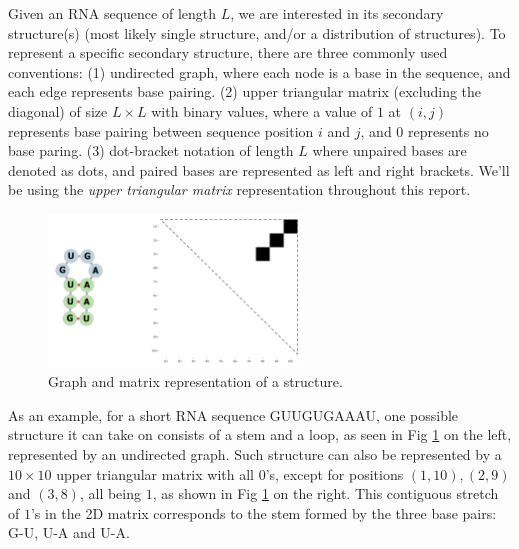 \documentclass[12pt]{article}
\begin{document}

Given an RNA sequence of length $L$, we are interested in its secondary structure(s) (most likely single structure, and/or a distribution of structures).
To represent a specific secondary structure, there are three commonly used conventions:
(1) undirected graph, where each node is a base in the sequence, and each edge represents base pairing.
(2) upper triangular matrix (excluding the diagonal)
of size $L \times L$ with binary values, where a value of $1$ at $(i, j)$ represents
base pairing between sequence position $i$ and $j$, and $0$ represents no base paring.
(3) dot-bracket notation of length $L$ where unpaired bases are denoted as dots,
    and paired bases are represented as left and right brackets.
We'll be using the \textit{upper triangular matrix} representation throughout this report.


\begin{figure}[h]
    \centering
    \includegraphics[width=0.6\textwidth]{plot/rna_ss_binary_mat.png}
    \caption{Graph and matrix representation of a structure.}
    \label{fig:rna_ss_binary_mat}
    \centering
\end{figure}

As an example, for a short RNA sequence GUUGUGAAAU, one possible structure it can take on
consists of a stem and a loop, as seen in Fig \ref{fig:rna_ss_binary_mat} on the left, represented by an undirected graph.
Such structure can also be represented by a $10 \times 10$ upper triangular matrix with all $0$'s,
except for positions
$(1, 10), (2, 9)$ and $(3, 8)$,
all being $1$, as shown in Fig \ref{fig:rna_ss_binary_mat} on the right.
This contiguous stretch of $1$'s in the 2D matrix corresponds to the stem formed by the three base pairs: G-U, U-A and U-A.
\end{document}
